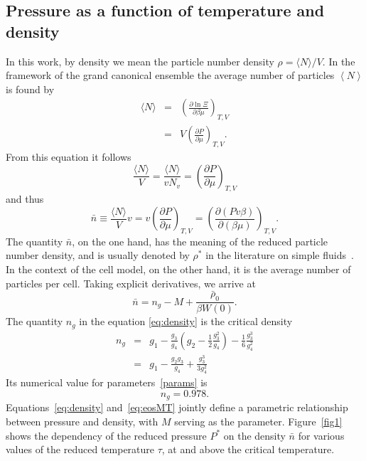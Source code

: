 \subsection{Pressure as a function of temperature and density}
In this work, by density we mean the particle number density $\rho = \langle N \rangle / V$.
In the framework of the grand canonical ensemble the average number of particles $\left\langle N \right\rangle$ is found by 
\begin{eqnarray*}
	\langle N \rangle & = & \left(\frac{\partial \ln\Xi}{\partial \beta \mu}\right)_{T,V} 
	\\
	& = & V \left(\frac{\partial P}{\partial \mu}\right)_{T,V}.
\end{eqnarray*}
From this equation it follows
\begin{equation*}
	\frac{\langle N \rangle}{V} = \frac{\langle N \rangle}{v N_v} = \left(\frac{\partial P}{\partial \mu}\right)_{T,V}
\end{equation*}
and thus
\begin{equation}
	\bar{n} \equiv \frac{\langle N \rangle}{V} v = v \left(\frac{\partial P}{\partial \mu}\right)_{T,V} 
	= \left(\frac{\partial (Pv\beta)}{\partial (\beta \mu)}\right)_{T,V}.
\end{equation}
The quantity $\bar{n}$, on the one hand, has the meaning of the reduced particle number density, and is usually denoted by $\rho^*$ in the literature on simple fluids~\cite{HansenMcDonald2013}. In the context of the cell model, on the other hand, it is the average number of particles per cell.
Taking explicit derivatives, we arrive at
\begin{equation}\label{eq:density}
	\bar n = n_g - M + \frac{ \bar \rho_0}{\beta W(0)}.
\end{equation}
The quantity $n_g$ in the equation \eqref{eq:density} is the critical density~\cite{KozlovskiiDobush2020}
\begin{eqnarray}\label{eq:crit_dens}
	n_g & = & g_1 - \frac{g_3}{g_4}\left(  g_2 - \frac{1}{2} \frac{g_3^2}{g_4}\right) - \frac{1}{6} \frac{g_3^3}{g_4^2} 
	\nonumber\\
	& = & g_1 - \frac{g_2 g_3}{g_4} + \frac{g_3^3}{3g_4^2}
\end{eqnarray}
Its numerical value for parameters~\eqref{params} is
\begin{equation*}
	n_g = 0.978.
\end{equation*}
Equations~\eqref{eq:density} and~\eqref{eq:eosMT} jointly define a parametric relationship between pressure and density, with $M$ serving as the parameter. Figure~\ref{fig1} shows the dependency of the reduced pressure $P^*$ on the density $\bar{n}$ for various values of the reduced temperature $\tau$, at and above the critical temperature.

